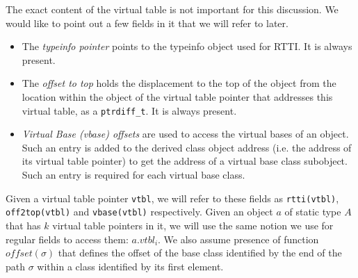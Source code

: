 \documentclass[preprint]{sigplanconf}
\makeatletter
\DeclareRobustCommand{\code}[1]{{\lstinline[breaklines=false,escapechar=@]{#1}}}
\makeatother
\begin{document}
The exact content of the virtual table is not important for this discussion. We 
would like to point out a few fields in it that we will refer to later.

\begin{itemize}
\item The \emph{typeinfo pointer} points to the typeinfo object used for RTTI. 
      It is always present.  
\item The \emph{offset to top} holds the displacement to the top of the object 
      from the location within the object of the virtual table pointer that 
      addresses this virtual table, as a \code{ptrdiff_t}. It is always present.
\item \emph{Virtual Base (vbase) offsets} are used to access the virtual bases 
      of an object. Such an entry is added to the derived class object address 
      (i.e. the address of its virtual table pointer) to get the address of a 
      virtual base class subobject. Such an entry is required for each virtual 
      base class.
\end{itemize}




\noindent
Given a virtual table pointer \code{vtbl}, we will refer to these fields as 
\code{rtti(vtbl)}, \code{off2top(vtbl)} and \code{vbase(vtbl)} respectively. 
Given an object $a$ of static type $A$ that has $k$ virtual table pointers in 
it, we will use the same notion we use for regular fields to access them: 
$a.vtbl_i$. We also assume presence of function $offset(\sigma)$ that defines 
the offset of the base class identified by the end of the path $\sigma$ within a 
class identified by its first element.
\end{document}

